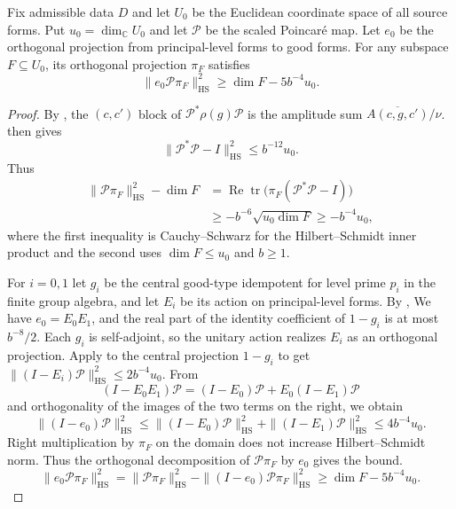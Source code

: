 \begin{lemma}
\label{lem:b-near-isometry}
\emitthmsource
Fix admissible data $D$ and let $U_0$ be the Euclidean coordinate space of all source forms.
Put $u_0=\dim_{\mathbb C}U_0$ and let $\mathcal P$ be the scaled Poincaré map.
Let $e_0$ be the orthogonal projection from principal-level forms to good forms. For any subspace $F\subseteq U_0$,
its orthogonal projection $\pi_F$ satisfies
\[
 \|e_0\mathcal P\pi_F\|_{\mathrm{HS}}^2\geq \dim F-5b^{-4}u_0.
\]
\end{lemma}
\begin{proof}
By ,
the $(c,c')$ block of $\mathcal P^*\rho(g)\mathcal P$ is the amplitude sum $\overline{A(c,g,c')}/\nu$.
 then gives
\[
 \|\mathcal P^*\mathcal P-I\|_{\mathrm{HS}}^2\le b^{-12}u_0 .
\]
Thus
\begin{align*}
 \|\mathcal P\pi_F\|_{\mathrm{HS}}^2-\dim F
 &=\operatorname{Re}\operatorname{tr}\bigl(\pi_F(\mathcal P^*\mathcal P-I)\bigr)\\
 &\ge -b^{-6}\sqrt{u_0\dim F}\ge -b^{-4}u_0 ,
\end{align*}
where the first inequality is Cauchy--Schwarz for the Hilbert--Schmidt inner product
and the second uses $\dim F\le u_0$ and $b\ge 1$.

For $i=0,1$ let $g_i$ be the central good-type idempotent for level prime $p_i$ in the finite group algebra,
and let $E_i$ be its action on principal-level forms.
By ,
We have $e_0=E_0E_1$, and the real part of the identity coefficient of $1-g_i$ is at most $b^{-8}/2$.
Each $g_i$ is self-adjoint, so the unitary action realizes $E_i$ as an orthogonal projection.
Apply  to the central projection $1-g_i$
to get $\|(I-E_i)\mathcal P\|_{\mathrm{HS}}^2\le 2b^{-4}u_0$.
From
\[
 (I-E_0E_1)\mathcal P=(I-E_0)\mathcal P+E_0(I-E_1)\mathcal P
\]
and orthogonality of the images of the two terms on the right, we obtain
\[
 \|(I-e_0)\mathcal P\|_{\mathrm{HS}}^2
 \le \|(I-E_0)\mathcal P\|_{\mathrm{HS}}^2
     +\|(I-E_1)\mathcal P\|_{\mathrm{HS}}^2
 \le 4b^{-4}u_0 .
\]
Right multiplication by $\pi_F$ on the domain does not increase Hilbert--Schmidt norm.
Thus the orthogonal decomposition of $\mathcal P\pi_F$ by $e_0$ gives the bound.
\[
 \|e_0\mathcal P\pi_F\|_{\mathrm{HS}}^2
 =\|\mathcal P\pi_F\|_{\mathrm{HS}}^2
   -\|(I-e_0)\mathcal P\pi_F\|_{\mathrm{HS}}^2
 \ge \dim F-5b^{-4}u_0 .
\]
\end{proof}

